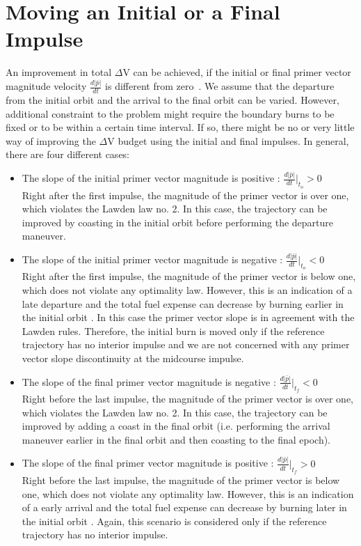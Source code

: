 \documentclass[12pt]{report}
\begin{document}
\section{Moving an Initial or a Final Impulse}
An improvement in total $\Delta$V can be achieved, if the initial
or final primer vector magnitude velocity $\frac{d|\bar{p}|}{dt}$
is different from zero~\cite{Schiff01}. We assume that the
departure from the initial orbit and the arrival to the final
orbit can be varied. However, additional constraint to the problem
might require the boundary burns to be fixed or to be within a
certain time interval. If so, there might be no or very little way
of improving the $\Delta$V budget using the initial and final
impulses.  In general, there are four different cases:
\begin{itemize}
  \item The slope of the initial primer vector magnitude is positive : $\frac{d|\bar{p}|}{dt}|_{t_{o}}>0$ \\
  \noindent Right after the first impulse, the magnitude of the
  primer vector is over one, which violates the Lawden law
  no. 2. In this case, the trajectory can be improved by coasting in
  the initial orbit before performing the departure maneuver.

  \item The slope of the initial primer vector magnitude is negative : $\frac{d|\bar{p}|}{dt}|_{t_{o}}<0$ \\
  \noindent Right after the first impulse, the magnitude of the
  primer vector is below one, which does not violate any optimality law.
  However, this is an indication of a late departure and the total fuel expense
  can decrease by burning earlier in the initial orbit
  \cite{Hiday92}. In this case the primer vector slope is in agreement with the Lawden rules.
  Therefore, the initial burn is moved only if the reference trajectory has no interior
  impulse and we are not concerned with any primer vector slope
  discontinuity at the midcourse impulse.

  \item The slope of the final primer vector magnitude is negative : $\frac{d|\bar{p}|}{dt}|_{t_{f}}<0$ \\
  \noindent Right before the last impulse, the magnitude of the
  primer vector is over one, which violates the Lawden law
  no. 2. In this case, the trajectory can be improved by adding  a coast in
  the final orbit (i.e. performing the arrival maneuver earlier in the final
  orbit and then coasting to the final epoch).

  \item The slope of the final primer vector magnitude is positive : $\frac{d|\bar{p}|}{dt}|_{t_{f}}>0$ \\
  \noindent Right before the last impulse, the magnitude of the
  primer vector is below one, which does not violate any optimality law.
  However, this is an indication of a early arrival and the total fuel expense
  can decrease by burning later in the initial orbit
  \cite{Hiday92}. Again, this scenario is considered only if the
  reference trajectory has no interior impulse.
\end{itemize}
\end{document}
